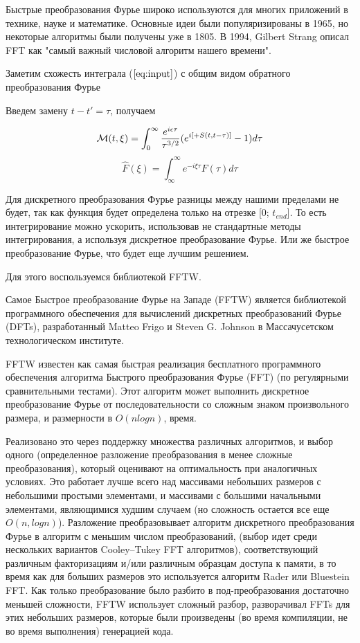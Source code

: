 \documentclass[14pt]{extarticle}
\newcommand{\cM}{\mathcal{M}}
\begin{document}
Быстрые преобразования Фурье широко используются для многих приложений в технике, науке и математике. Основные идеи были популяризированы в 1965, но некоторые алгоритмы были получены уже в 1805. В 1994, Gilbert Strang описал FFT как "самый важный числовой алгоритм нашего времени".

Заметим схожесть интеграла ($\ref{eq:input}$) с общим видом обратного преобразования Фурье

Введем замену $t - t' = \tau$, получаем

\begin{equation}\label{eq:fourier}
	\cM (t, \xi) = \int_{0}^{\infty}\frac{e^{i\epsilon \tau}}{{\tau}^{3/2}}(e^{i [+ S(t, t-\tau)]} - 1) d\tau\\ 
\end{equation}
$$\hat{F}(\xi) = \int_{\infty}^{\infty}e^{- i\xi \tau} F(\tau) d\tau $$

Для дискретного преобразования Фурье разницы между нашими пределами не будет, так как функция будет определена только на отрезке [0; $t_{end}$].
То есть интегрирование можно ускорить, использовав не стандартные методы интегрирования, а используя дискретное преобразование Фурье. Или же быстрое преобразование Фурье, что будет еще лучшим решением.

Для этого воспользуемся библиотекой FFTW.

Самое Быстрое преобразование Фурье на Западе (FFTW) является библиотекой программного обеспечения для вычислений дискретных преобразований Фурье (DFTs), разработанный Matteo Frigo и Steven G. Johnson в Массачусетском технологическом институте.

FFTW известен как самая быстрая реализация бесплатного программного обеспечения алгоритма Быстрого преобразования Фурье (FFT) (по регулярными сравнительными тестами). Этот алгоритм может выполнить дискретное преобразование Фурье от последовательности со сложным знаком произвольного размера, и размерности в $O (n log n)$, время.

Реализовано это через поддержку множества различных алгоритмов, и выбор одного (определенное разложение преобразования в менее сложные преобразования), который оценивают на оптимальность при аналогичных условиях. Это работает лучше всего над массивами небольших размеров с небольшими простыми элементами, и массивами с большими начальными элементами, являющимися худшим случаем (но сложность остается все еще $O (n, log n)$). Разложение преобразовывает алгоритм дискретного преобразования Фурье в алгоритм с  меньшим числом преобразований, (выбор идет среди нескольких вариантов Cooley–Tukey FFT алгоритмов), соответствующий различным факторизациям и/или различным образцам доступа к памяти, в то время как для больших размеров это используется алгоритм Rader или Bluestein FFT. Как только преобразование было разбито в под-преобразования достаточно меньшей сложности, FFTW использует сложный разбор, разворачивал FFTs для этих небольших размеров, которые были произведены (во время компиляции, не во время выполнения) генерацией кода.
\end{document}
